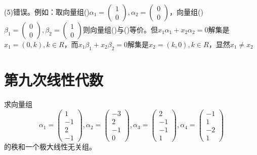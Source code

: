 \documentclass[a4paper]{report}
\begin{document}
\begin{jie}
(5)错误。例如：取向量组(\uppercase\expandafter{})$\alpha_1=
\begin{pmatrix}
1\\ 0
\end{pmatrix}
,\alpha_2=
\begin{pmatrix}
0 \\0
\end{pmatrix}$，向量组(\uppercase\expandafter{})$\beta_1=
\begin{pmatrix}
0\\ 0
\end{pmatrix}
,\beta_2=
\begin{pmatrix}
1 \\0
\end{pmatrix}$则向量组(\uppercase\expandafter{})与(\uppercase\expandafter{})等价。但$x_1\alpha_1+x_2\alpha_2=0$解集是$x_1=(0,k),k\in R$，而$x_1\beta_1+x_2\beta_2=0$解集是$x_2=(k,0),k\in R$，显然$x_1\neq x_2$
\end{jie}
\clearpage
\section{第九次线性代数}
\EX 求向量组
\begin{equation*}
\alpha_1=
\begin{pmatrix}
1\\ -1\\ 2\\ -1
\end{pmatrix},
\alpha_2=
\begin{pmatrix}
-3\\ 2\\ -1\\ 0
\end{pmatrix},
\alpha_3=
\begin{pmatrix}
2\\ -1\\-1\\ 1
\end{pmatrix},
\alpha_4=
\begin{pmatrix}
-1\\ 1\\ -2\\ 1
\end{pmatrix}
\end{equation*}
的秩和一个极大线性无关组。
\end{document}
